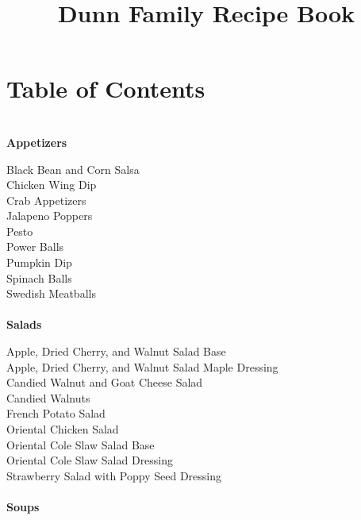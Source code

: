 \documentclass[11pt, twoside, openany]{book}
\title{ \LARGE \textbf{Dunn Family Recipe Book}}
\begin{document}
\maketitle
\section*{Table of Contents}
{~\vspace{2mm}\\ \Large \textbf{Appetizers}}\hfill\textbf{\pageref{appetizers}}

Black Bean and Corn Salsa\hrulefill\pageref{black-bean-and-corn-salsa}\\
Chicken Wing Dip\hrulefill\pageref{chicken-wing-dip}\\
Crab Appetizers\hrulefill\pageref{crab-appetizers}\\
Jalapeno Poppers\hrulefill\pageref{jalapeno-poppers}\\
Pesto\hrulefill\pageref{pesto}\\
Power Balls\hrulefill\pageref{power-balls}\\
Pumpkin Dip\hrulefill\pageref{pumpkin-dip}\\
Spinach Balls\hrulefill\pageref{spinach-balls}\\
Swedish Meatballs\hrulefill\pageref{swedish-meatballs}\\
{~\vspace{2mm}\\ \Large \textbf{Salads}}\hfill\textbf{\pageref{salads}}

Apple, Dried Cherry, and Walnut Salad Base\hrulefill\pageref{apple,-dried-cherry,-and-walnut-salad-base}\\
Apple, Dried Cherry, and Walnut Salad Maple Dressing\hrulefill\pageref{apple,-dried-cherry,-and-walnut-salad-maple-dressing}\\
Candied Walnut and Goat Cheese Salad\hrulefill\pageref{candied-walnut-and-goat-cheese-salad}\\
Candied Walnuts\hrulefill\pageref{candied-walnuts}\\
French Potato Salad\hrulefill\pageref{french-potato-salad}\\
Oriental Chicken Salad\hrulefill\pageref{oriental-chicken-salad}\\
Oriental Cole Slaw Salad Base\hrulefill\pageref{oriental-cole-slaw-salad-base}\\
Oriental Cole Slaw Salad Dressing\hrulefill\pageref{oriental-cole-slaw-salad-dressing}\\
Strawberry Salad with Poppy Seed Dressing\hrulefill\pageref{strawberry-salad-with-poppy-seed-dressing}\\
{~\vspace{2mm}\\ \Large \textbf{Soups}}\hfill\textbf{\pageref{soups}}
\end{document}
